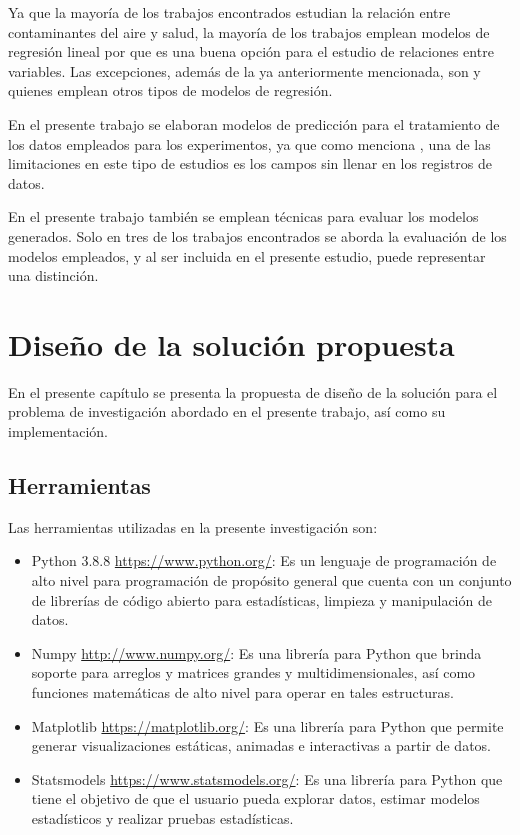 Ya que la mayoría de los trabajos encontrados estudian la relación entre contaminantes del aire y salud, la mayoría de los trabajos emplean modelos de regresión lineal por que es una buena opción para el estudio de relaciones entre variables. Las excepciones, además de la ya anteriormente mencionada, son \citet{r17} y \citet{r18} quienes emplean otros tipos de modelos de regresión.

En el presente trabajo se elaboran modelos de predicción para el tratamiento de los datos empleados para los experimentos, ya que como menciona \citet{r15}, una de las limitaciones en este tipo de estudios es los campos sin llenar en los registros de datos.

En el presente trabajo también se emplean técnicas para evaluar los modelos generados. Solo en tres de los trabajos encontrados se aborda la evaluación de los modelos empleados, y al ser incluida en el presente estudio, puede representar una distinción.

\chapter{Diseño de la solución propuesta}
En el presente capítulo se presenta la propuesta de diseño de la solución para el problema de investigación abordado en el presente trabajo, así como su implementación.

\section{Herramientas}
Las herramientas utilizadas en la presente investigación son:
\begin{itemize}
	\item Python 3.8.8 \url{https://www.python.org/}: Es un lenguaje de programación de alto nivel para programación de propósito general que cuenta con un conjunto de librerías de código abierto para estadísticas, limpieza y manipulación de datos.
	\item Numpy \url{http://www.numpy.org/}: Es una librería para Python que brinda soporte para arreglos y matrices grandes y multidimensionales, así como funciones matemáticas de alto nivel para operar en tales estructuras.  
	\item Matplotlib \url{https://matplotlib.org/}: Es una librería para Python que permite generar visualizaciones estáticas, animadas e interactivas a partir de datos.
	\item Statsmodels \url{https://www.statsmodels.org/}: Es una librería para Python que tiene el objetivo de que el usuario pueda explorar datos, estimar modelos estadísticos y realizar pruebas estadísticas.
\end{itemize}

